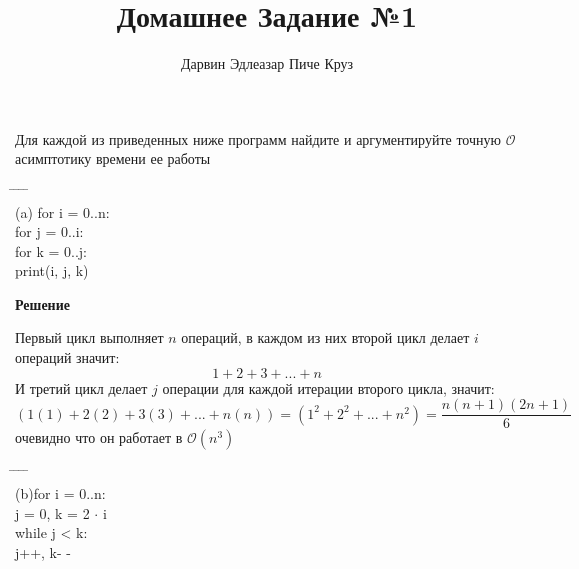 \documentclass{article}
\title{Домашнее Задание №1}
\author{Дарвин Эдлеазар Пиче Круз}
\begin{document}
\maketitle

\section{}

Для каждой из приведенных ниже программ найдите и аргументируйте точную $\mathcal{O}$ асимптотику времени ее работы

\begin{tabbing}
    \hspace{1 cm} \= \hspace{1 cm}  \= \hspace{1 cm} \= \hspace{1 cm} \= \hspace{1 cm}\\
\> (a) for i = 0..n:\\
\>\> for j = 0..i:\\
\> \> \> for k = 0..j:\\
\>\>\>\> print(i, j, k)
\end{tabbing}

\textbf{Решение}

Первый цикл выполняет $n$ операций, в каждом из них второй цикл делает $i$ операций значит:
\begin{equation*}
    1+2+3+...+n
\end{equation*}
И третий цикл делает $j$ операции для каждой итерации второго цикла, значит:
\begin{equation*}
    (1(1)+2(2)+3(3)+...+n(n)) = (1^2+2^2+...+n^2) = \dfrac{n(n+1)(2n + 1)}{6}
\end{equation*}
очевидно что он работает в $\mathcal{O}(n^3)$

\begin{tabbing}
    \hspace{1 cm} \= \hspace{1 cm}  \= \hspace{1 cm} \= \hspace{1 cm} \= \hspace{1 cm}\\
\> (b)for i = 0..n:\\
\>\>j = 0, k = 2 $\cdot$ i\\
\>\>while j < k:\\
\>\>\>j++, k- -\\
\end{tabbing}
\end{document}
